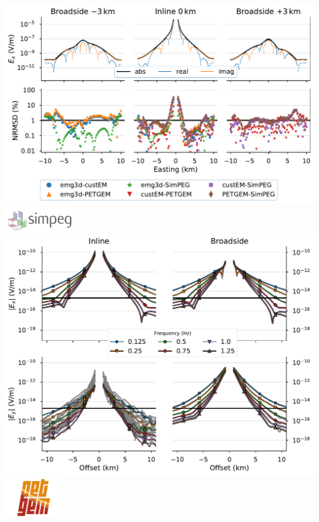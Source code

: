\documentclass[xcolor=svgnames, aspectratio=169]{beamer}
\begin{document}
\begin{frame}[c]
\begin{columns}
      \includegraphics[width=\textwidth, trim=70 095 0 160, clip]{results-block}
    \centering
      \includegraphics[width=3cm]{Logo-SimPEG2}\\[.5cm]
      \includegraphics[width=\textwidth, trim=65 242 50 20, clip]{results-marlim-responses}\\[.5cm]
      \includegraphics[width=2.5cm]{Logo-PETGEM}

\end{columns}
\end{frame}
\end{document}
